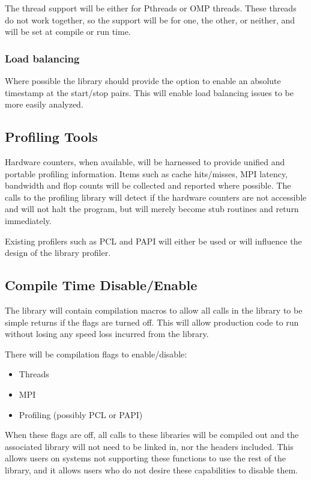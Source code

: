 \documentclass[]{article}
\begin{document}
The thread support will be either for Pthreads or OMP threads.  These threads do
not work together, so the support will be for one, the other, or neither, and
will be set at compile or run time.

\subsubsection{Load balancing}

Where possible the library should provide the option to enable an absolute
timestamp at the start/stop pairs.  This will enable load balancing issues to
be more easily analyzed.

\subsection{Profiling Tools}

Hardware counters, when available, will be harnessed to provide unified and
portable profiling information.  Items such as cache hits/misses, MPI latency,
bandwidth and flop counts will be collected and reported where possible.
The calls to the profiling library will detect if the hardware counters are not
accessible and will not halt the program, but will merely become stub routines
and return immediately.   

Existing profilers such as PCL \cite{pcl} and PAPI \cite{papi} will either be used
or will influence the design of the library profiler.

\subsection{Compile Time Disable/Enable}

The library will contain compilation macros to allow all calls in the library
to be simple returns if the flags are turned off.  This will allow production
code to run without losing any speed loss incurred from the library.

There will be compilation flags to enable/disable:

\begin{itemize}
\item{Threads}
\item{MPI}
\item{Profiling (possibly PCL or PAPI)}
\end{itemize}

When these flags are off, all calls to these libraries will be compiled out and
the associated library will not need to be linked in, nor the headers
included. This allows users on systems not supporting these functions to use
the rest of the library, and it allows users who do not desire these
capabilities to disable them.
\end{document}
